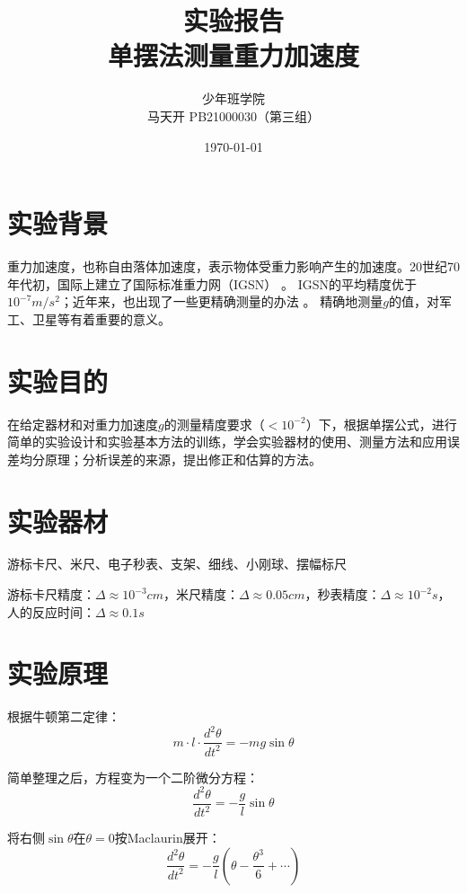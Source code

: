 \documentclass[a4paper]{ltxdoc}
\title{实验报告\\单摆法测量重力加速度}
\author{少年班学院\\马天开 PB21000030（第三组）}
\date{\today}
\begin{document}
\begin{multicols}{2}
  \maketitle
  \section{实验背景}
  重力加速度，也称自由落体加速度，表示物体受重力影响产生的加速度。20世纪70年代初，国际上建立了国际标准重力网（IGSN）
  。
  IGSN的平均精度优于$10^{-7}m/s^2$；近年来，也出现了一些更精确测量的办法
  。
  精确地测量$g$的值，对军工、卫星等有着重要的意义。
  \section[实验目的]{实验目的}
  在给定器材和对重力加速度$g$的测量精度要求（$< 10^{-2}$）下，根据单摆公式，进行简单的实验设计和实验基本方法的训练，学会实验器材的使用、测量方法和应用误差均分原理；分析误差的来源，提出修正和估算的方法。
  \section{实验器材}
  游标卡尺、米尺、电子秒表、支架、细线、小刚球、摆幅标尺

  游标卡尺精度：$\Delta\approx 10^{-3}cm$，米尺精度：$\Delta\approx 0.05cm$，秒表精度：$\Delta\approx 10^{-2}s$，人的反应时间：$\Delta\approx 0.1s$
  \section{实验原理}
  根据牛顿第二定律：
  \begin{equation}
    m\cdot l\cdot \frac {d^2 \theta}{dt^2} = -mg\sin\theta
  \end{equation}

  简单整理之后，方程变为一个二阶微分方程：
  \begin{equation}
    \frac {d^2 \theta}{dt^2} = -\frac g l \sin\theta \label{XX}
  \end{equation}

  将右侧$\sin\theta$在$\theta = 0$按Maclaurin展开：
  \begin{equation}
    \frac {d^2 \theta}{dt^2} = -\frac g l (\theta - \frac {\theta^3} 6 +\cdots)
  \end{equation}


\end{multicols}
\end{document}
